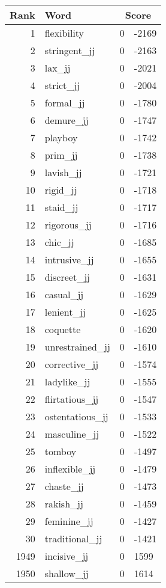 \begin{longtable}[!htbp]{| rlr@{.}l |}
    \hline
    \textbf{Rank} & \textbf{Word} & \multicolumn{2}{c|}{\textbf{Score}} \\
    \hline
    \endhead
    1 & flexibility & 0 & -2169 \\
    2 & stringent\_jj & 0 & -2163 \\
    3 & lax\_jj & 0 & -2021 \\
    4 & strict\_jj & 0 & -2004 \\
    5 & formal\_jj & 0 & -1780 \\
    6 & demure\_jj & 0 & -1747 \\
    7 & playboy & 0 & -1742 \\
    8 & prim\_jj & 0 & -1738 \\
    9 & lavish\_jj & 0 & -1721 \\
    10 & rigid\_jj & 0 & -1718 \\
    11 & staid\_jj & 0 & -1717 \\
    12 & rigorous\_jj & 0 & -1716 \\
    13 & chic\_jj & 0 & -1685 \\
    14 & intrusive\_jj & 0 & -1655 \\
    15 & discreet\_jj & 0 & -1631 \\
    16 & casual\_jj & 0 & -1629 \\
    17 & lenient\_jj & 0 & -1625 \\
    18 & coquette & 0 & -1620 \\
    19 & unrestrained\_jj & 0 & -1610 \\
    20 & corrective\_jj & 0 & -1574 \\
    21 & ladylike\_jj & 0 & -1555 \\
    22 & flirtatious\_jj & 0 & -1547 \\
    23 & ostentatious\_jj & 0 & -1533 \\
    24 & masculine\_jj & 0 & -1522 \\
    25 & tomboy & 0 & -1497 \\
    26 & inflexible\_jj & 0 & -1479 \\
    27 & chaste\_jj & 0 & -1473 \\
    28 & rakish\_jj & 0 & -1459 \\
    29 & feminine\_jj & 0 & -1427 \\
    30 & traditional\_jj & 0 & -1421 \\
    1949 & incisive\_jj & 0 & 1599 \\
    1950 & shallow\_jj & 0 & 1614 \\

\end{longtable}
